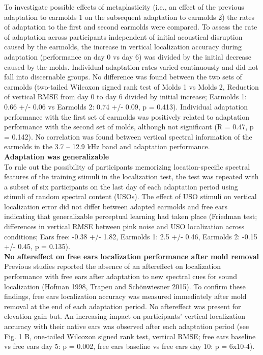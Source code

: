 To investigate possible effects of metaplasticity (i.e., an effect of the previous adaptation to earmolds 1 on the subsequent adaptation to earmolds 2) the rates of adaptation to the first and second earmolds were compared. To assess the rate of adaptation across participants independent of initial acoustical disruption caused by the earmolds, the increase in vertical localization accuracy during adaptation (performance on day 0 vs day 6) was divided by the initial decrease caused by the molds. Individual adaptation rates varied continuously and did not fall into discernable groups. No difference was found between the two sets of earmolds (two-tailed Wilcoxon signed rank test of Molds 1 vs Molds 2, Reduction of vertical RMSE from day 0 to day 6 divided by initial increase; Earmolds 1: 0.66 +/- 0.06 vs Earmolds 2:  0.74 +/- 0.09, p = 0.413). Individual adaptation performance with the first set of earmolds was positively related to adaptation performance with the second set of molds, although not significant (R = 0.47, p = 0.142). No correlation was found between vertical spectral information of the earmolds in the 3.7 – 12.9 kHz band and adaptation performance.\\

\noindent\textbf{Adaptation was generalizable}\\

To rule out the possibility of participants memorizing location-specific spectral features of the training stimuli in the localization test, the test was repeated with a subset of six participants on the last day of each adaptation period using stimuli of random spectral content (USOs). The effect of USO stimuli on vertical localization error did not differ between adapted earmolds and free ears indicating that generalizable perceptual learning had taken place (Friedman test; differences in vertical RMSE between pink noise and USO localization across conditions; Ears free: -0.38 +/- 1.82, Earmolds 1: 2.5 +/- 0.46, Earmolds 2: -0.15 +/- 0.45, p = 0.135).\\

\noindent\textbf{No aftereffect on free ears localization performance after mold removal}\\

Previous studies reported the absence of an aftereffect on localization performance with free ears after adaptation to new spectral cues for sound localization (Hofman 1998, Trapeu and Schönwiesner 2015). To confirm these findings, free ears localization accuracy was measured immediately after mold removal at the end of each adaptation period. 
No aftereffect was present for elevation gain but. An increasing impact on participants’ vertical localization accuracy with their native ears was observed after each adaptation period (see Fig. 1 B, one-tailed Wilcoxon signed rank test, vertical RMSE; free ears baseline vs free ears day 5: p = 0.002, free ears baseline vs free ears day 10: p = 6x10-4). \\

